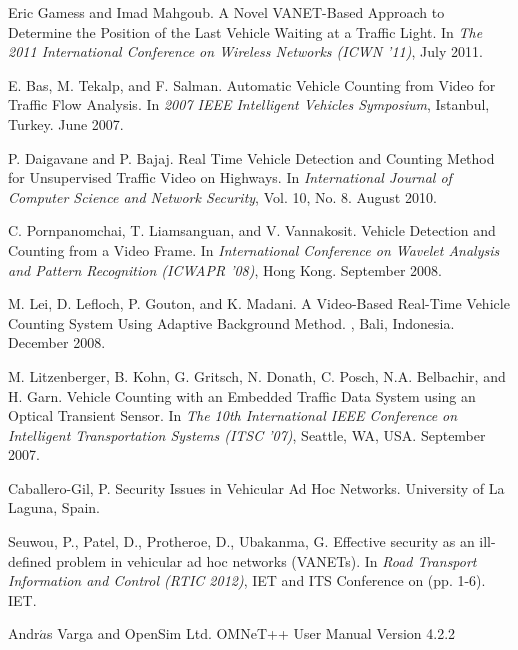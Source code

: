 \documentclass[english,a4paper,babel,12pt]{nitathesis}
\numberwithin{figure}{chapter}
\begin{document}
\begin{thebibliography}{11}
Eric Gamess and Imad Mahgoub.
\newblock A Novel VANET-Based Approach to Determine the Position of the Last Vehicle Waiting at a Traffic Light.
\newblock In {\em The 2011 International Conference on Wireless Networks (ICWN ’11)}, July 2011.

E. Bas, M. Tekalp, and F. Salman.
\newblock Automatic Vehicle Counting from Video for Traffic Flow Analysis.
\newblock In {\em 2007 IEEE Intelligent Vehicles Symposium}, Istanbul, Turkey. June 2007.

P. Daigavane and P. Bajaj.
\newblock Real Time Vehicle Detection and Counting Method for Unsupervised Traffic Video on Highways.
\newblock In {\em International Journal of Computer Science and Network Security}, Vol. 10, No. 8. August 2010.

C. Pornpanomchai, T. Liamsanguan, and V. Vannakosit.
\newblock Vehicle Detection and Counting from a Video Frame.
\newblock In {\em International Conference on Wavelet Analysis and Pattern Recognition (ICWAPR ’08)}, Hong Kong. September 2008.
 
M. Lei, D. Lefloch, P. Gouton, and K. Madani.
\newblock A Video-Based Real-Time Vehicle Counting System Using Adaptive Background Method.
, Bali, Indonesia. December 2008.

M. Litzenberger, B. Kohn, G. Gritsch, N. Donath, C. Posch, N.A. Belbachir, and H. Garn. 
\newblock Vehicle Counting with an Embedded Traffic Data System using an Optical Transient Sensor. 
\newblock In {\em The 10th International IEEE Conference on Intelligent Transportation Systems (ITSC ’07)}, Seattle, WA, USA. September 2007.

Caballero-Gil, P. 
\newblock Security Issues in Vehicular Ad Hoc Networks.
\newblock University of La Laguna, Spain.

Seuwou, P., Patel, D., Protheroe, D., Ubakanma, G.
\newblock Effective security as an ill-defined problem in vehicular ad hoc networks (VANETs). 
\newblock In {\em Road Transport Information and Control (RTIC 2012)}, IET and ITS Conference on (pp. 1-6). IET.

Andr$\acute{a}$s Varga and OpenSim Ltd.
\newblock OMNeT++ User Manual Version 4.2.2

\end{thebibliography}
\end{document}
